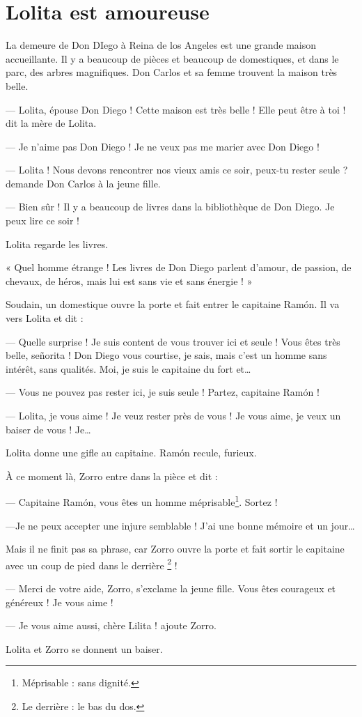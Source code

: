 \chapter{Lolita est amoureuse}
La demeure de Don DIego à Reina de los Angeles est une grande maison accueillante. Il y a beaucoup de pièces et beaucoup de
domestiques, et dans le parc, des arbres magnifiques. Don Carlos et sa femme trouvent la maison très belle.

--- Lolita, épouse Don Diego ! Cette maison est très belle ! Elle peut être à toi ! dit la mère de Lolita.

--- Je n'aime pas Don Diego ! Je ne veux pas me marier avec Don Diego !

--- Lolita ! Nous devons rencontrer nos vieux amis ce soir, peux-tu rester seule ? demande Don Carlos à la jeune fille.

--- Bien sûr ! Il y a beaucoup de livres dans la bibliothèque de Don Diego. Je peux lire ce soir !

Lolita regarde les livres.

« Quel homme étrange ! Les livres de Don Diego parlent d'amour, de passion, de chevaux, de héros, mais lui est sans vie et sans
énergie ! »

Soudain, un domestique ouvre la porte et fait entrer le capitaine Ramón. Il va vers Lolita et dit :

--- Quelle surprise ! Je suis content de vous trouver ici et seule ! Vous êtes très belle, señorita ! Don Diego vous courtise, je
    sais, mais c'est un homme sans intérêt, sans qualités. Moi, je suis le capitaine du fort et\ldots{}

--- Vous ne pouvez pas rester ici, je suis seule ! Partez, capitaine Ramón !

--- Lolita, je vous aime ! Je veuz rester près de vous ! Je vous aime, je veux un baiser de vous ! Je\ldots{}

Lolita donne une gifle au capitaine. Ramón recule, furieux.

À ce moment là, Zorro entre dans la pièce et dit :

--- Capitaine Ramón, vous êtes un homme méprisable\footnote{Méprisable : sans dignité.}. Sortez !

---Je ne peux accepter une injure semblable ! J'ai une bonne mémoire et un jour\ldots{}

Mais il ne finit pas sa phrase, car Zorro ouvre la porte et fait sortir le capitaine avec un coup de pied dans le derrière
\footnote{Le derrière : le bas du dos.} !

--- Merci de votre aide, Zorro, s'exclame la jeune fille. Vous êtes courageux et généreux ! Je vous aime !

--- Je vous aime aussi, chère Lilita ! ajoute Zorro.

Lolita et Zorro se donnent un baiser.

